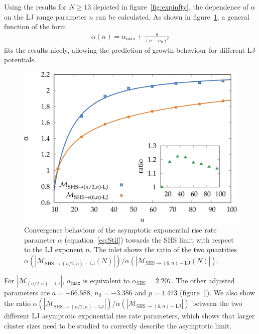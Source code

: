 Using the results for $N \geq 13$ depicted in figure~\ref{fig:expinfty}, the
dependence of $\alpha$ on the \ac{LJ} range parameter $n$ can be calculated. As
shown in figure~\ref{fig:repulsive13-14}, a general function of the form
%
\begin{align}
\label{expgrowth}
    \alpha(n)=\alpha_\text{max}+\frac{a}{(n-n_0)^{p}}
\end{align}
%
fits the results nicely, allowing the prediction of growth behaviour for
different \ac{LJ} potentials. 
%
\begin{figure}[htb]
    \centering
    \includegraphics[width=0.8\columnwidth]{kslj/repulsive13-14.pdf}
    \caption{Convergence behaviour of the asymptotic exponential rise rate
    parameter $\alpha$ (equation~\eqref{eq:Stil}) towards the \acs{SHS} limit with
    respect to the \acs{LJ} exponent $n$. The inlet shows the ratio of the two
    quantities $\alpha(|\mathcal{M}_{\text{SHS}\to (n/2,n)-\text{LJ}}(N)|)
    / \alpha(|\mathcal{M}_{\text{SHS}\to (6,n)-\text{LJ}}(N)|)$.}
    \label{fig:repulsive13-14}
\end{figure}
%
For $|\mathcal{M}_{(n/2,n)-\text{LJ}}|$, $\alpha_\text{max}$ is equivalent to
$\alpha_\text{SHS}=2.207$. The other adjusted parameters are $a=-66.588$,
$n_0=-3.386$ and $p=1.473$ (figure~\ref{fig:repulsive13-14}). We also show the
ratio $\alpha(|\mathcal{M}_{\text{SHS}\to (n/2,n)-\text{LJ}}|) /
\alpha(|\mathcal{M}_{\text{SHS}\to (6,n)-\text{LJ}}|)$ between the two different
\ac{LJ} asymptotic exponential rise rate parameters, which shows that larger
cluster sizes need to be studied to correctly describe the asymptotic limit. 

